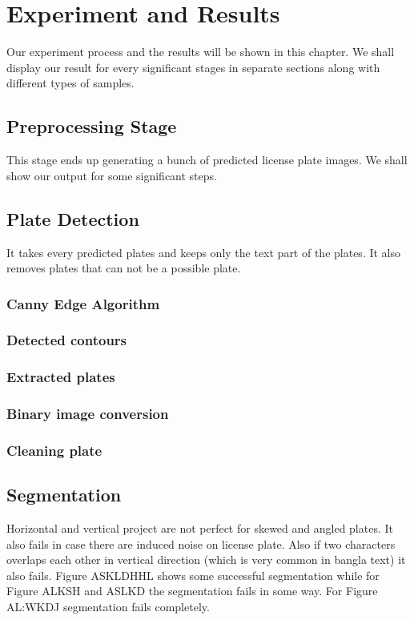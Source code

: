 \documentclass{standalone}
\begin{document}
\chapter{Experiment and Results}
Our experiment process and the results will be shown in this chapter. We shall display our result for every significant stages in separate sections along with different types of samples.


\section{Preprocessing Stage}
This stage ends up generating a bunch of predicted license plate images. We shall show our output for some significant steps.
  
  
  
  
  
  


\section{Plate Detection}
It takes every predicted plates and keeps only the text part of the plates. It also removes plates that can not be a possible plate.

  \subsection{Canny Edge Algorithm}
  
  \subsection{Detected contours}
  
  \subsection{Extracted plates} 
  
  \subsection{Binary image conversion} 
  
  \subsection{Cleaning plate} 


\section{Segmentation}
Horizontal and vertical project are not perfect for skewed and angled plates. It also fails in case there are induced noise on license plate. Also if two characters overlaps each other in vertical direction (which is very common in bangla text) it also fails. Figure ASKLDHHL shows some successful segmentation while for Figure ALKSH and ASLKD the segmentation fails in some way. For Figure AL:WKDJ segmentation fails completely.
\end{document}
